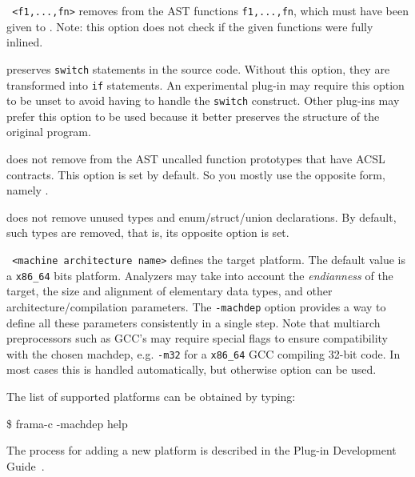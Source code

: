 \begin{description}
\item \texttt{ <f1,...,fn>} removes from the AST
  functions \texttt{f1,...,fn}, which must have been given to
  . Note: this option does not check if the given
  functions were fully inlined.

\item {} preserves \texttt{switch} statements in the
  source code. Without this option, they are transformed into \texttt{if}
  statements. An experimental plug-in may require this option to be unset
  to avoid having to handle the \texttt{switch} construct.
  Other plug-ins may prefer this option to be used because it better
  preserves the structure of the original program.

\item {} does not remove from the
  AST uncalled function prototypes that have ACSL contracts. This option is
  set by default. So you mostly use the opposite form, namely
  .

\item {} does not remove unused types and
  enum/struct/union declarations. By default, such types are removed,
  that is, its opposite option  is set.

\item \texttt{ <machine architecture name>} defines the
  target platform. The default value is a \texttt{x86\_64} bits
  platform. Analyzers may take into account the \emph{endianness} of the
  target, the size and alignment of elementary data types, and other
  architecture/compilation parameters. The \texttt{-machdep} option provides a
  way to define all these parameters consistently in a single step.
  Note that multiarch preprocessors such as GCC's may require special flags
  to ensure compatibility with the chosen machdep, e.g. \texttt{-m32} for a
  \texttt{x86\_64} GCC compiling 32-bit code. In most cases this is handled
  automatically, but otherwise option  can be used.

The list of supported platforms can be obtained by typing:
\begin{shell}
\$ frama-c -machdep help
\end{shell}

The process for adding a new platform is described in the Plug-in
Development Guide~\cite{plugin-dev-guide}.


\end{description}
